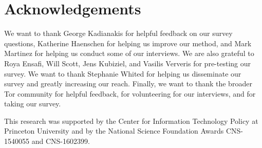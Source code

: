 \section*{Acknowledgements}
We want to thank George Kadianakis for helpful feedback on our survey questions,
Katherine Haenschen for helping us improve our method, and Mark Martinez for
helping us conduct some of our interviews.  We are also grateful to Roya Ensafi,
Will Scott, Jens Kubiziel, and Vasilis Ververis for pre-testing our survey.  We
want to thank Stephanie Whited for helping us disseminate our survey and greatly
increasing our reach.  Finally, we want to thank the broader Tor community for
helpful feedback, for volunteering for our interviews, and for taking our
survey.

This research was supported by the Center for Information Technology Policy at
Princeton University and by the National Science Foundation Awards CNS-1540055
and CNS-1602399.
